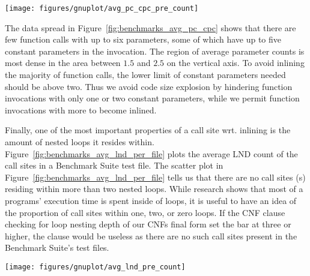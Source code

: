 \begin{centering}
	\noindent\begin{minipage}{\textwidth}
		\captionsetup{type=figure}
		\hspace{-1em}
		\texttt{[image: figures/gnuplot/avg\_pc\_cpc\_pre\_count]}
	\end{minipage}
	\label{fig:benchmarks_avg_pc_cpc}
\end{centering}

The data spread in Figure~\ref{fig:benchmarks_avg_pc_cpc} shows that there are
few function calls with up to six parameters, some of which have up to five
constant parameters in the invocation. The region of average parameter counts is
most dense in the area between $1.5$ and $2.5$ on the vertical axis. To avoid
inlining the majority of function calls, the lower limit of constant parameters
needed should be above two. Thus we avoid code size explosion by hindering
function invocations with only one or two constant parameters, while we permit
function invocations with more to become inlined.

Finally, one of the most important properties of a call site wrt. inlining is
the amount of nested loops it resides within.
Figure~\ref{fig:benchmarks_avg_lnd_per_file} plots the average LND count of the
call sites in a Benchmark Suite test file. The scatter plot in
Figure~\ref{fig:benchmarks_avg_lnd_per_file} tells us that there are no call
sites (\applyNode s) residing within more than two nested loops. While research
shows that most of a programs' execution time is spent inside of loops, it is
useful to have an idea of the proportion of call sites within one, two, or zero
loops. If the CNF clause checking for loop nesting depth of our CNFs final form
set the bar at three or higher, the clause would be useless as there are no such
call sites present in the Benchmark Suite's test files.

\begin{centering}
	\noindent\begin{minipage}{\textwidth}
		\captionsetup{type=figure}
		\hspace{-1em}
		\texttt{[image: figures/gnuplot/avg\_lnd\_pre\_count]}
	\end{minipage}
	\label{fig:benchmarks_avg_lnd_per_file}
\end{centering}

